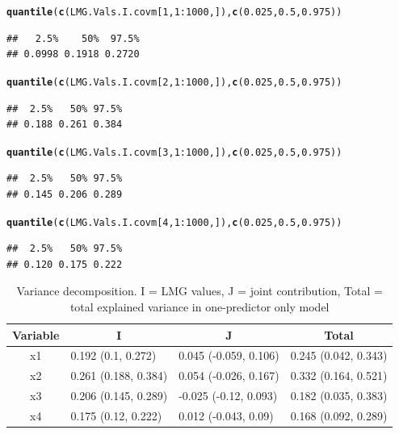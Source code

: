 \documentclass[11pt,a4paper,twoside]{book}\usepackage[]{graphicx}\usepackage[]{color}
\makeatletter
\newcommand{\hlnum}[1]{\textcolor[rgb]{0.686,0.059,0.569}{#1}}%
\newcommand{\hlopt}[1]{\textcolor[rgb]{0,0,0}{#1}}%
\newcommand{\hlstd}[1]{\textcolor[rgb]{0.345,0.345,0.345}{#1}}%
\newcommand{\hlkwd}[1]{\textcolor[rgb]{0.737,0.353,0.396}{\textbf{#1}}}%
\newenvironment{kframe}{%
 \def\at@end@of@kframe{}%
 \ifinner\ifhmode%
  \def\at@end@of@kframe{\end{minipage}}%
  \begin{minipage}{\columnwidth}%
 \fi\fi%
 \def\FrameCommand##1{\hskip\@totalleftmargin \hskip-\fboxsep
 \colorbox{shadecolor}{##1}\hskip-\fboxsep
     \hskip-\linewidth \hskip-\@totalleftmargin \hskip\columnwidth}%
 \MakeFramed {\advance\hsize-\width
   \@totalleftmargin\z@ \linewidth\hsize
   \@setminipage}}%
 {\par\unskip\endMakeFramed%
 \at@end@of@kframe}
\newenvironment{knitrout}{}{} %
\makeatother
\begin{document}
\begin{knitrout}
\begin{kframe}
\begin{alltt}
\hlkwd{quantile}\hlstd{(}\hlkwd{c}\hlstd{(LMG.Vals.I.covm[}\hlnum{1}\hlstd{,}\hlnum{1}\hlopt{:}\hlnum{1000}\hlstd{,]),} \hlkwd{c}\hlstd{(}\hlnum{0.025}\hlstd{,} \hlnum{0.5}\hlstd{,} \hlnum{0.975}\hlstd{))}
\end{alltt}
\begin{verbatim}
##   2.5%    50%  97.5% 
## 0.0998 0.1918 0.2720
\end{verbatim}
\begin{alltt}
\hlkwd{quantile}\hlstd{(}\hlkwd{c}\hlstd{(LMG.Vals.I.covm[}\hlnum{2}\hlstd{,}\hlnum{1}\hlopt{:}\hlnum{1000}\hlstd{,]),} \hlkwd{c}\hlstd{(}\hlnum{0.025}\hlstd{,} \hlnum{0.5}\hlstd{,} \hlnum{0.975}\hlstd{))}
\end{alltt}
\begin{verbatim}
##  2.5%   50% 97.5% 
## 0.188 0.261 0.384
\end{verbatim}
\begin{alltt}
\hlkwd{quantile}\hlstd{(}\hlkwd{c}\hlstd{(LMG.Vals.I.covm[}\hlnum{3}\hlstd{,}\hlnum{1}\hlopt{:}\hlnum{1000}\hlstd{,]),} \hlkwd{c}\hlstd{(}\hlnum{0.025}\hlstd{,} \hlnum{0.5}\hlstd{,} \hlnum{0.975}\hlstd{))}
\end{alltt}
\begin{verbatim}
##  2.5%   50% 97.5% 
## 0.145 0.206 0.289
\end{verbatim}
\begin{alltt}
\hlkwd{quantile}\hlstd{(}\hlkwd{c}\hlstd{(LMG.Vals.I.covm[}\hlnum{4}\hlstd{,}\hlnum{1}\hlopt{:}\hlnum{1000}\hlstd{,]),} \hlkwd{c}\hlstd{(}\hlnum{0.025}\hlstd{,} \hlnum{0.5}\hlstd{,} \hlnum{0.975}\hlstd{))}
\end{alltt}
\begin{verbatim}
##  2.5%   50% 97.5% 
## 0.120 0.175 0.222
\end{verbatim}
\end{kframe}
\end{knitrout}


\begin{table}[h]
\centering
\begin{tabular}{clll}
  \hline
  \multicolumn{1}{c}{\textbf{Variable}} & \multicolumn{1}{c}{\textbf{I}} &\multicolumn{1}{c}{\textbf{J}} & \multicolumn{1}{c}{\textbf{Total}} \\
  \hline
x1 & 0.192 (0.1, 0.272)  & 0.045 (-0.059, 0.106)   & 0.245 (0.042, 0.343)  \\ 
x2 & 0.261 (0.188, 0.384)  & 0.054 (-0.026, 0.167)   & 0.332 (0.164, 0.521)  \\ 
x3 & 0.206 (0.145, 0.289)  & -0.025 (-0.12, 0.093)   & 0.182 (0.035, 0.383)  \\ 
x4 & 0.175 (0.12, 0.222)  & 0.012 (-0.043, 0.09)   & 0.168 (0.092, 0.289)  \\ 

   \hline
\end{tabular}
\caption{Variance decomposition. I = LMG values, J = joint contribution, Total = total explained variance in one-predictor only model}
\label{tbl:fundus.to.SLO3}
\end{table}
\end{document}
